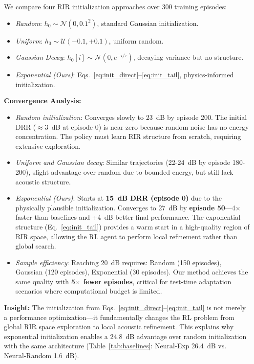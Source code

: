 \documentclass[12pt,a4paper]{article}
\begin{document}
We compare four RIR initialization approaches over 300 training episodes:

\begin{itemize}
\item \textit{Random}: $h_0 \sim \mathcal{N}(0, 0.1^2)$, standard Gaussian initialization.
\item \textit{Uniform}: $h_0 \sim \mathcal{U}(-0.1, +0.1)$, uniform random.
\item \textit{Gaussian Decay}: $h_0[i] \sim \mathcal{N}(0, e^{-i/\tau})$, decaying variance but no structure.
\item \textit{Exponential (Ours)}: Eqs.~\eqref{eq:init_direct}--\eqref{eq:init_tail}, physics-informed initialization.
\end{itemize}

\textbf{Convergence Analysis:}
\begin{itemize}
\item \textit{Random initialization}: Converges slowly to 23~dB by episode 200. The initial DRR ($\approx$3~dB at episode 0) is near zero because random noise has no energy concentration. The policy must learn RIR structure from scratch, requiring extensive exploration.

\item \textit{Uniform and Gaussian decay}: Similar trajectories (22-24~dB by episode 180-200), slight advantage over random due to bounded energy, but still lack acoustic structure.

\item \textit{Exponential (Ours)}: Starts at \textbf{15~dB DRR (episode 0)} due to the physically plausible initialization. Converges to 27~dB by \textbf{episode 50}---4$\times$ faster than baselines and +4~dB better final performance. The exponential structure (Eq.~\eqref{eq:init_tail}) provides a warm start in a high-quality region of RIR space, allowing the RL agent to perform local refinement rather than global search.

\item \textit{Sample efficiency}: Reaching 20~dB requires: Random (150 episodes), Gaussian (120 episodes), Exponential (30 episodes). Our method achieves the same quality with \textbf{5$\times$ fewer episodes}, critical for test-time adaptation scenarios where computational budget is limited.
\end{itemize}

\textbf{Insight:} The initialization from Eqs.~\eqref{eq:init_direct}--\eqref{eq:init_tail} is not merely a performance optimization---it fundamentally changes the RL problem from global RIR space exploration to local acoustic refinement. This explains why exponential initialization enables a 24.8~dB advantage over random initialization with the same architecture (Table~\ref{tab:baselines}: Neural-Exp 26.4~dB vs. Neural-Random 1.6~dB).
\end{document}

